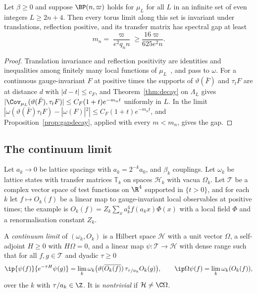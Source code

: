 \begin{corollary}\label{cor:latticegap}
Let $\beta\ge0$ and suppose $\BP(n,\varpi)$ holds for $\mu_L$ for all $L$ in an
infinite set of even integers $L\ge2n+4$. Then every torus limit along this
set is invariant under translations, reflection positive, and its transfer
matrix has spectral gap at least
\[
m_n=\frac{\varpi}{e^2q_nn}\ge\frac{16\varpi}{625e^2n}.
\]
\end{corollary}

\begin{proof}
Translation invariance and reflection positivity are identities and
inequalities among finitely many local functions of $\mu_L$~\cite{OSei78}, and
pass to $\omega$. For a continuous gauge-invariant $F$ at positive times the
supports of $\vartheta(\bar F)$ and $\tau_tF$ are at distance $d$ with $|d-t|\le
c_F$, and Theorem~\ref{thm:decay} on $\Lambda_L$ gives $|\Cov_{\mu_L}(\vartheta(\bar
F),\tau_tF)|\le C_F(1+t)e^{-m_nt}$ uniformly in $L$. In the limit
$|\omega(\vartheta(\bar F)\tau_tF)-|\omega(F)|^2|\le C_F(1+t)e^{-m_nt}$, and
Proposition~\ref{prop:gapdecay}, applied with every $m<m_n$, gives the gap.
\end{proof}

\subsection{The continuum limit}

Let $a_k\to0$ be lattice spacings with $a_k=2^{-k}a_0$, and $\beta_k$ couplings.
Let $\omega_k$ be lattice states with transfer matrices $\mathbb T_k$ on spaces
$\mathcal H_k$ with vacua $\Omega_k$. Let $\mathcal T$ be a complex vector space of
test functions on $\R^4$ supported in $\{t>0\}$, and for each $k$ let $f\mapsto
O_k(f)$ be a linear map to gauge-invariant local observables at positive
times; the example is $O_k(f)=Z_k\sum_xa_k^4f(a_kx)\Phi(x)$ with a local field
$\Phi$ and a renormalisation constant $Z_k$.

\begin{definition}\label{def:limit}
A \emph{continuum limit} of $(\omega_k,O_k)$ is a Hilbert space $\mathcal H$ with
a unit vector $\Omega$, a self-adjoint $H\ge0$ with $H\Omega=0$, and a linear
map $\psi:\mathcal T\to\mathcal H$ with dense range such that for all
$f,g\in\mathcal T$ and dyadic $\tau\ge0$
\[
\ip{\psi(f)}{e^{-\tau H}\psi(g)}=\lim_k\omega_k\bigl(\vartheta(\overline{O_k(f)})
\,\tau_{\tau/a_k}O_k(g)\bigr),\qquad
\ip\Omega{\psi(f)}=\lim_k\omega_k(O_k(f)),
\]
over the $k$ with $\tau/a_k\in\Z$. It is \emph{nontrivial} if $\mathcal H\ne\C
\Omega$.
\end{definition}

